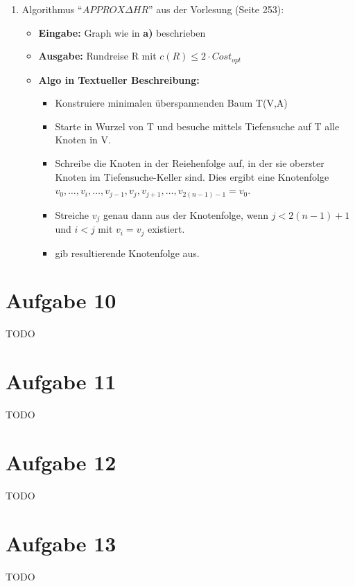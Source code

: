 \documentclass[10pt,a4paper]{article}
\begin{document}
\begin{enumerate}[label={\alph*)}]
        \item Algorithmus ``$APPROX \Delta HR$'' aus der Vorlesung (Seite 253):
            \begin{itemize}
                \item \textbf{Eingabe:} Graph wie in \textbf{a)} beschrieben
                \item \textbf{Ausgabe:} Rundreise R mit $c(R) \leq 2 \cdot Cost_{opt}$
                \item \textbf{Algo in Textueller Beschreibung:} \\
                    \begin{itemize}
                        \item Konstruiere minimalen überspannenden Baum T(V,A)
                        \item Starte in Wurzel von T und besuche mittels Tiefensuche
                            auf T alle Knoten in V.
                        \item Schreibe die Knoten in der Reiehenfolge auf, in der
                            sie oberster Knoten im Tiefensuche-Keller sind. Dies
                            ergibt eine Knotenfolge $v_0,\ldots,v_i,\ldots,
                            v_{j-1},v_j,v_{j+1},\ldots,v_{2(n-1)-1} = v_0$.
                        \item Streiche $v_j$ genau dann aus der Knotenfolge, wenn
                        $ j < 2(n-1) + 1 $ und $ i < j $ mit $ v_i = v_j$ existiert.
                        \item gib resultierende Knotenfolge aus.
                    \end{itemize}

            \end{itemize}



            
    \end{enumerate}

    
\section*{Aufgabe 10}
    TODO
    
\section*{Aufgabe 11}
    TODO
    
\section*{Aufgabe 12}
    TODO
    
\section*{Aufgabe 13}
    TODO
    
    
    
\end{document}
